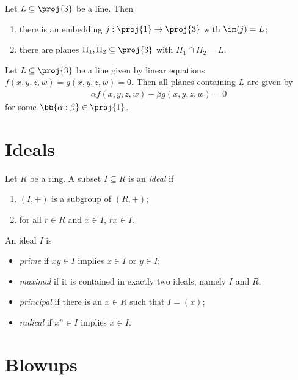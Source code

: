 \documentclass{article}
\begin{document}
\begin{lemma}
  Let $L\subseteq\proj{3}$ be a line. Then
  \begin{enumerate}
    \item there is an embedding $j:\proj{1}\to\proj{3}$ with $\im(j)=L$;
    \item there are planes $\Pi_1,\Pi_2\subseteq\proj{3}$ with
      $\Pi_1\cap\Pi_2=L$.
  \end{enumerate}
\end{lemma}

\begin{lemma}
  Let $L\subseteq\proj{3}$ be a line given by linear equations
  $f(x,y,z,w)=g(x,y,z,w)=0$. Then all planes containing $L$ are given by
  \begin{align*}
    \alpha f(x,y,z,w) + \beta g(x,y,z,w) = 0
  \end{align*}
  for some $\bb{\alpha:\beta}\in\proj{1}$.
\end{lemma}

\section{Ideals}

\begin{definition}
  Let $R$ be a ring. A subset $I\subseteq R$ is an \emph{ideal} if
  \begin{enumerate}
    \item $(I,+)$ is a subgroup of $(R,+)$;
    \item for all $r\in R$ and $x\in I$, $rx\in I$.
  \end{enumerate}
\end{definition}

\begin{definition}
  An ideal $I$ is
  \begin{itemize}
    \item \emph{prime} if $xy\in I$ implies $x\in I$ or $y\in I$;
    \item \emph{maximal} if it is contained in exactly two ideals,
      namely $I$ and $R$;
    \item \emph{principal} if there is an $x\in R$ such that
      $I=(x)$;
    \item \emph{radical} if $x^n\in I$ implies $x\in I$.
  \end{itemize}
\end{definition}

\section{Blowups}
\end{document}
